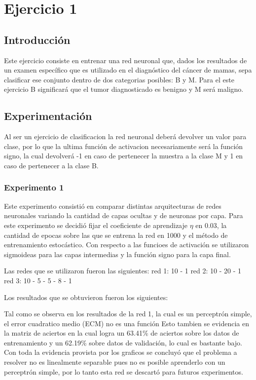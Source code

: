 \section{Ejercicio 1}

\subsection{Introducción}
Este ejercicio consiste en entrenar una red neuronal que, dados los resultados de un examen específico que es utilizado en el diagnóstico del
cáncer de mamas, sepa clasificar ese conjunto dentro de dos categorias posibles: B y M. Para el este ejercicio B significará que el tumor diagnosticado
es benigno y M será maligno.

\subsection{Experimentación}
Al ser un ejercicio de clasificacion la red neuronal deberá devolver un valor para clase, por lo que la ultima función de activacion necesariamente
será la función signo, la cual devolverá -1 en caso de pertenecer la muestra a la clase M y 1 en caso de pertenecer a la clase B.

\subsubsection{Experimento 1}
Este experimento consistió en comparar distintas arquitecturas de redes neuronales variando la cantidad de capas ocultas y de neuronas por capa.
Para este experimento se decidió fijar el coeficiente de aprendizaje $\eta$ en 0.03, la cantidad de epocas sobre las que se entrena la red en 1000 y el
método de entrenamiento estocástico. Con respecto a las funcioes de activación se utilizaron sigmoideas para las capas intermedias y la función signo
para la capa final.

Las redes que se utilizaron fueron las siguientes:
red 1: 10 - 1
red 2: 10 - 20 - 1
red 3: 10 - 5 - 5 - 8 - 1

Los resultados que se obtuvieron fueron los siguientes:

 Tal como se observa en los resultados de la red 1, la cual es un perceptrón simple, el error cuadratico medio (ECM) no es una función
 Esto tambien se evidencia en la matriz de aciertos en la cual logra un 63.41\% de aciertos sobre los datos de entrenamiento y un 62.19\% sobre datos de validación,
 lo cual es bastante bajo. Con toda la evidencia provista por los graficos se concluyó que el problema a resolver no es linealmente separable pues no es posible
 aprenderlo con un perceptrón simple, por lo tanto esta red se descartó para futuros experimentos.

